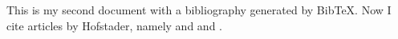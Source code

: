 \documentclass[a4paper]{article}
\begin{document}
This is my second document with a bibliography generated by Bib\TeX. Now I cite articles by Hofstader, namely \cite{hofs53} and \cite{hofs55} and \cite{yearian}.


    
\end{document}
